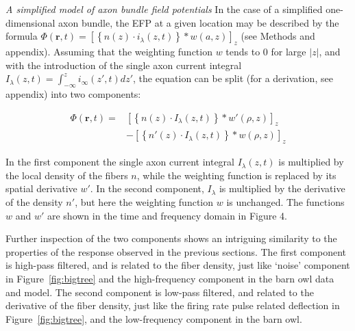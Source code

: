 \documentclass[]{article}
\begin{document}
\emph{A simplified model of axon bundle field potentials} In the case of
a simplified one-dimensional axon bundle, the EFP at a given location
may be described by the formula
\(\Phi(\mathbf{r},t) = \left[\left\{n(z)\cdot i_\lambda(z,t)\right\}\ast w(a,z)\right]_z\)
(see Methods and appendix). Assuming that the weighting function \(w\)
tends to 0 for large \(\left|z\right|\), and with the introduction of
the single axon current integral
\(I_\lambda(z,t)=\int_{-\infty}^zi_\infty(z',t)dz'\), the equation can
be split (for a derivation, see appendix) into two components:

\begin{align}
  \label{eqn:splitpot} 
  \Phi(\mathbf{r},t) = &\left[\left\{n(z)\cdot I_\lambda(z,t)\right\}\ast w'(\rho,z)\right]_z \\
  & - \left[\left\{n'(z)\cdot I_\lambda(z,t)\right\}\ast w(\rho,z)\right]_z 
\end{align}

In the first component the single axon current integral
\(I_\lambda(z,t)\) is multiplied by the local density of the fibers
\(n\), while the weighting function is replaced by its spatial
derivative \(w'\). In the second component, \(I_\lambda\) is multiplied
by the derivative of the density \(n'\), but here the weighting function
\(w\) is unchanged. The functions \(w\) and \(w'\) are shown in the time
and frequency domain in Figure 4.

Further inspection of the two components shows an intriguing similarity
to the properties of the response observed in the previous sections. The
first component is high-pass filtered, and is related to the fiber
density, just like `noise' component in Figure~\ref{fig:bigtree} and the
high-frequency component in the barn owl data and model. The second
component is low-pass filtered, and related to the derivative of the
fiber density, just like the firing rate pulse related deflection in
Figure~\ref{fig:bigtree}, and the low-frequency component in the barn
owl.
\end{document}
